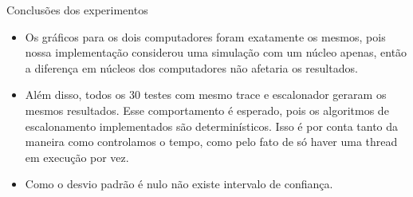\documentclass[10pt]{beamer}
\begin{document}
    \begin{frame}{Conclusões dos experimentos}
        \begin{itemize}
            \justifying
            \item Os gráficos para os dois computadores foram exatamente os mesmos,
                pois nossa implementação
                considerou uma simulação com um núcleo apenas, então a diferença em
                núcleos dos computadores não afetaria os resultados.
            \item Além disso, todos os 30 testes com mesmo trace e escalonador
                geraram os mesmos resultados. Esse comportamento é esperado,
                pois os algoritmos de escalonamento implementados são
                determinísticos. Isso é por conta tanto da maneira como controlamos
                o tempo, como pelo fato de só haver uma thread em execução por vez.
            \item Como o desvio padrão é nulo não existe
                intervalo de confiança.
        \end{itemize}
    \end{frame}
\end{document}

